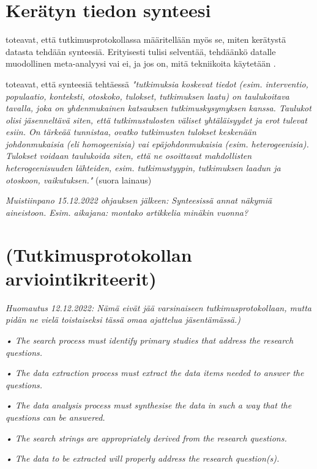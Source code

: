 \documentclass[utf8]{gradu3}
\begin{document}
\section{Kerätyn tiedon synteesi}

\textcite{kitchenham-charters-2007} toteavat, että tutkimusprotokollassa määritellään myös se, miten kerätystä datasta tehdään synteesiä. Erityisesti tulisi selventää, tehdäänkö datalle muodollinen meta-analyysi vai ei, ja jos on, mitä tekniikoita käytetään \parencite{kitchenham-charters-2007}. 

\textcite{kitchenham-charters-2007} toteavat, että synteesiä tehtäessä \textit{"tutkimuksia koskevat tiedot (esim. interventio, populaatio, konteksti, otoskoko, tulokset, tutkimuksen laatu) on taulukoitava tavalla, joka on yhdenmukainen katsauksen tutkimuskysymyksen kanssa. Taulukot olisi jäsenneltävä siten, että tutkimustulosten väliset yhtäläisyydet ja erot tulevat esiin. On tärkeää tunnistaa, ovatko tutkimusten tulokset keskenään johdonmukaisia (eli homogeenisia) vai epäjohdonmukaisia (esim. heterogeenisia). Tulokset voidaan taulukoida siten, että ne osoittavat mahdollisten heterogeenisuuden lähteiden, esim. tutkimustyypin, tutkimuksen laadun ja otoskoon, vaikutuksen."} (suora lainaus)


\textit{Muistiinpano 15.12.2022 ohjauksen jälkeen: Synteesissä annat näkymiä aineistoon. Esim. aikajana: montako artikkelia minäkin vuonna?}



\section{(Tutkimusprotokollan arviointikriteerit)}

\textit{Huomautus 12.12.2022: Nämä eivät jää varsinaiseen tutkimusprotokollaan, mutta pidän ne vielä toistaiseksi tässä omaa ajattelua jäsentämässä.)}

\textit{• The search process must identify primary studies that address the research questions.
}

\textit{• The data extraction process must extract the data items needed to answer the questions.
}

\textit{• The data analysis process must synthesise the data in such a way that the questions can be answered.
}

\textit{• The search strings are appropriately derived from the research questions.
}

\textit{• The data to be extracted will properly address the research question(s).
}
\end{document}
